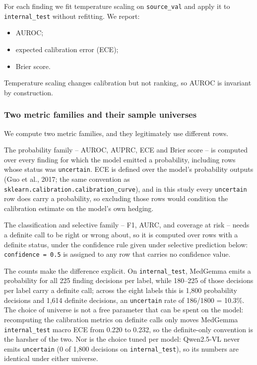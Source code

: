 For each finding we fit temperature scaling on \texttt{source\_val} and apply it to \texttt{internal\_test} without refitting. We report:

\begin{itemize}
\item AUROC;
\item expected calibration error (ECE);
\item Brier score.
\end{itemize}

Temperature scaling changes calibration but not ranking, so AUROC is invariant by construction.

\subsubsection{Two metric families and their sample universes}

We compute two metric families, and they legitimately use different rows.

The probability family -- AUROC, AUPRC, ECE and Brier score -- is computed over every finding for which the model emitted a probability, including rows whose status was \texttt{uncertain}. ECE is defined over the model's probability outputs (Guo et al., 2017; the same convention as \texttt{sklearn.\allowbreak calibration.\allowbreak calibration\_curve}), and in this study every \texttt{uncertain} row does carry a probability, so excluding those rows would condition the calibration estimate on the model's own hedging.

The classification and selective family -- F1, AURC, and coverage at risk -- needs a definite call to be right or wrong about, so it is computed over rows with a definite status, under the confidence rule given under selective prediction below: \texttt{confidence = 0.5} is assigned to any row that carries no confidence value.

The counts make the difference explicit. On \texttt{internal\_test}, MedGemma emits a probability for all 225 finding decisions per label, while 180--225 of those decisions per label carry a definite call; across the eight labels this is 1,800 probability decisions and 1,614 definite decisions, an \texttt{uncertain} rate of 186/1800 = 10.3\%. The choice of universe is not a free parameter that can be spent on the model: recomputing the calibration metrics on definite calls only moves MedGemma \texttt{internal\_test} macro ECE from 0.220 to 0.232, so the definite-only convention is the harsher of the two. Nor is the choice tuned per model: Qwen2.5-VL never emits \texttt{uncertain} (0 of 1,800 decisions on \texttt{internal\_test}), so its numbers are identical under either universe.

